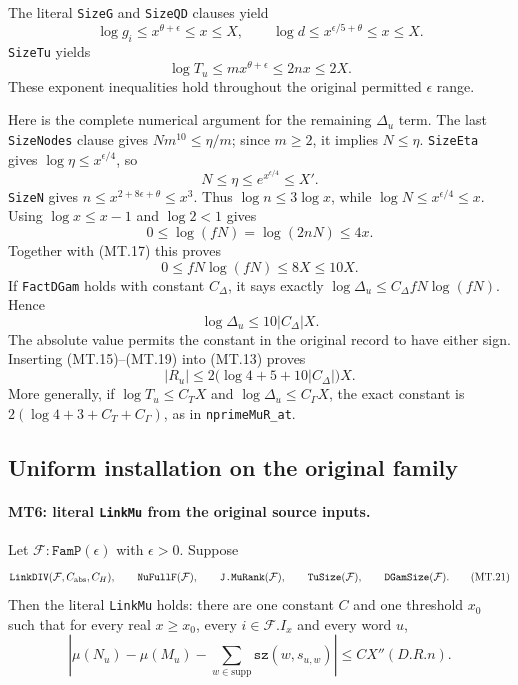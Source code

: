 The literal \texttt{SizeG} and \texttt{SizeQD} clauses yield
\[
 \log g_i\le x^{\theta+\epsilon}\le x\le X,
 \qquad
 \log d\le x^{\epsilon/5+\theta}\le x\le X.                       \tag{MT.15}
\]
\texttt{SizeTu} yields
\[
               \log T_u\le mx^{\theta+\epsilon}
                               \le2nx\le2X.                       \tag{MT.16}
\]
These exponent inequalities hold throughout the original permitted
$\epsilon$ range.

Here is the complete numerical argument for the remaining
$\Delta_u$ term.  The last \texttt{SizeNodes} clause gives
$Nm^{10}\le\eta/m$; since $m\ge2$, it implies $N\le\eta$.
\texttt{SizeEta} gives $\log\eta\le x^{\epsilon/4}$, so
\[
                   N\le\eta\le e^{x^{\epsilon/4}}\le X'.         \tag{MT.17}
\]
\texttt{SizeN} gives $n\le x^{2+8\epsilon+\theta}\le x^3$.
Thus $\log n\le3\log x$, while $\log N\le x^{\epsilon/4}\le x$.
Using $\log x\le x-1$ and $\log2<1$ gives
\[
                  0\le\log(fN)=\log(2nN)\le4x.
\]
Together with (MT.17) this proves
\[
                    0\le fN\log(fN)\le8X\le10X.                  \tag{MT.18}
\]
If \texttt{FactDGam} holds with constant $C_\Delta$, it says exactly
$\log\Delta_u\le C_\Delta fN\log(fN)$.  Hence
\[
                   \log\Delta_u\le10|C_\Delta|X.                 \tag{MT.19}
\]
The absolute value permits the constant in the original record to have
either sign.  Inserting (MT.15)--(MT.19) into (MT.13) proves
\[
                  |R_u|\le
          2\bigl(\log4+5+10|C_\Delta|\bigr)X.                    \tag{MT.20}
\]
More generally, if $\log T_u\le C_TX$ and
$\log\Delta_u\le C_\Gamma X$, the exact constant is
$2(\log4+3+C_T+C_\Gamma)$, as in \texttt{nprimeMuR\_at}.

\subsection{Uniform installation on the original family}

\paragraph{MT6: literal \texttt{LinkMu} from the original source inputs.}
\label{claim:MT6}
Let $\mathcal F:\texttt{FamP}(\epsilon)$ with $\epsilon>0$.  Suppose
\[
 \texttt{LinkDIV}(\mathcal F,C_{\rm abs},C_H),\qquad
 \texttt{NuFullF}(\mathcal F),\qquad
 \texttt{J.MuRank}(\mathcal F),\qquad
 \texttt{TuSize}(\mathcal F),\qquad
 \texttt{DGamSize}(\mathcal F).                                  \tag{MT.21}
\]
Then the literal \texttt{LinkMu} holds: there are one constant $C$
and one threshold $x_0$ such that for every real $x\ge x_0$, every
$i\in\mathcal F.I_x$ and every word $u$,
\[
 \left|\mu(N_u)-\mu(M_u)
       -\sum_{w\in\mathrm{supp}}\texttt{sz}(w,s_{u,w})\right|
                 \le C X''(D.R.n).                              \tag{MT.22}
\]

